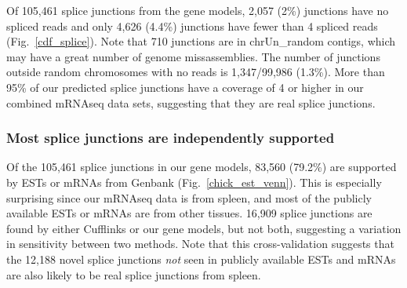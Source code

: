 \documentclass[10pt]{article}
\begin{document}
Of 105,461 splice junctions from the gene models, 2,057 (2\%) junctions have no
spliced reads and only 4,626 (4.4\%) junctions have fewer than 4 spliced reads
(Fig.~\ref{cdf_splice}).  Note that 710 junctions are in chrUn\_random contigs,
which may have a great number of genome missassemblies. The number of junctions
outside random chromosomes with no reads is 1,347/99,986 (1.3\%).
More than 95\% of our predicted splice junctions have a coverage
of 4 or higher in our combined mRNAseq data sets, suggesting that they are
real splice junctions.

\subsubsection*{Most splice junctions are independently supported}

Of the 105,461 splice junctions in our gene models, 83,560 (79.2\%) are
supported by ESTs or mRNAs from Genbank (Fig.~\ref{chick_est_venn}).  This is
especially surprising since our mRNAseq data is from spleen, and most of the
publicly available ESTs or mRNAs are from other tissues. 16,909 splice junctions
are found by either Cufflinks or our gene models, but not both, suggesting a variation in
sensitivity between two methods. Note that this cross-validation suggests that
the 12,188 novel splice junctions {\em not} seen in publicly available ESTs and
mRNAs are also likely to be real splice junctions from spleen.
\end{document}
